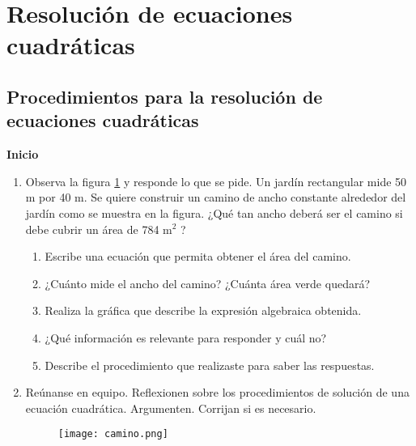 \thispagestyle{plain}
\section{Resolución de ecuaciones cuadráticas}

\subsection{Procedimientos para la resolución de ecuaciones cuadráticas}

\begin{boxK}
    \begin{center}\textbf{Inicio}\end{center}
    \begin{enumerate}
        \item Observa la figura \ref{fig:camino} y responde lo que se pide.
              Un jardín rectangular mide 50 m por 40 m. Se quiere construir un camino de ancho
              constante alrededor del jardín como se muestra en la figura. ¿Qué tan ancho deberá
              ser el camino si debe cubrir un área de 784 m$^2$ ?
              \begin{enumerate}
                  \item Escribe una ecuación que permita obtener el área del camino.
                  \item ¿Cuánto mide el ancho del camino? ¿Cuánta área verde quedará?
                  \item Realiza la gráfica que describe la expresión algebraica obtenida.
                  \item ¿Qué información es relevante para responder y cuál no?
                  \item Describe el procedimiento que realizaste para saber las respuestas.
              \end{enumerate}
        \item Reúnanse en equipo. Reflexionen sobre los procedimientos de solución
              de una ecuación cuadrática. Argumenten. Corrijan si es necesario.
              \begin{figure}[H]
                  \centering
                  \texttt{[image: camino.png]}
                  \label{fig:camino}
              \end{figure}
    \end{enumerate}
\end{boxK}


